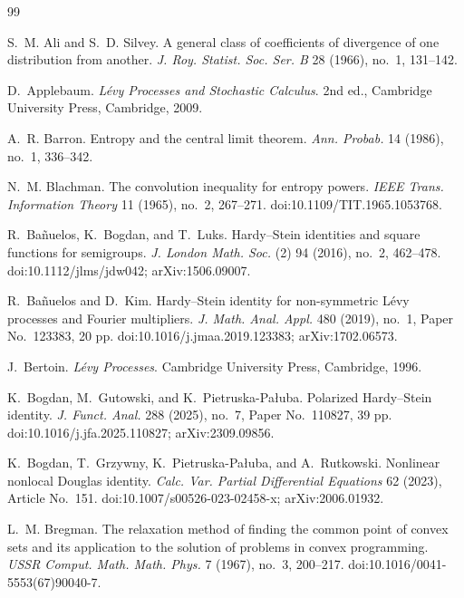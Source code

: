 \begin{thebibliography}{99}

S.~M. Ali and S.~D. Silvey.
\newblock A general class of coefficients of divergence of one distribution
from another.
\newblock \emph{J. Roy. Statist. Soc. Ser. B} 28 (1966), no.~1, 131--142.

D.~Applebaum.
\newblock \emph{L{\'e}vy Processes and Stochastic Calculus}.
\newblock 2nd ed., Cambridge University Press, Cambridge, 2009.

A.~R. Barron.
\newblock Entropy and the central limit theorem.
\newblock \emph{Ann. Probab.} 14 (1986), no.~1, 336--342.

N.~M. Blachman.
\newblock The convolution inequality for entropy powers.
\newblock \emph{IEEE Trans. Information Theory} 11 (1965), no.~2, 267--271.
\newblock doi:10.1109/TIT.1965.1053768.

R.~Ba{\~n}uelos, K.~Bogdan, and T.~Luks.
\newblock Hardy--Stein identities and square functions for semigroups.
\newblock \emph{J. London Math. Soc.} (2) 94 (2016), no.~2, 462--478.
\newblock doi:10.1112/jlms/jdw042; arXiv:1506.09007.

R.~Ba{\~n}uelos and D.~Kim.
\newblock Hardy--Stein identity for non-symmetric L{\'e}vy processes and
Fourier multipliers.
\newblock \emph{J. Math. Anal. Appl.} 480 (2019), no.~1, Paper No.~123383,
20 pp.
\newblock doi:10.1016/j.jmaa.2019.123383; arXiv:1702.06573.

J.~Bertoin.
\newblock \emph{L{\'e}vy Processes}.
\newblock Cambridge University Press, Cambridge, 1996.

K.~Bogdan, M.~Gutowski, and K.~Pietruska-Pa{\l}uba.
\newblock Polarized Hardy--Stein identity.
\newblock \emph{J. Funct. Anal.} 288 (2025), no.~7, Paper No.~110827,
39 pp.
\newblock doi:10.1016/j.jfa.2025.110827; arXiv:2309.09856.

K.~Bogdan, T.~Grzywny, K.~Pietruska-Pa{\l}uba, and A.~Rutkowski.
\newblock Nonlinear nonlocal Douglas identity.
\newblock \emph{Calc. Var. Partial Differential Equations} 62 (2023),
Article No.~151.
\newblock doi:10.1007/s00526-023-02458-x; arXiv:2006.01932.

L.~M. Bregman.
\newblock The relaxation method of finding the common point of convex sets and
its application to the solution of problems in convex programming.
\newblock \emph{USSR Comput. Math. Math. Phys.} 7 (1967), no.~3, 200--217.
\newblock doi:10.1016/0041-5553(67)90040-7.


\end{thebibliography}
